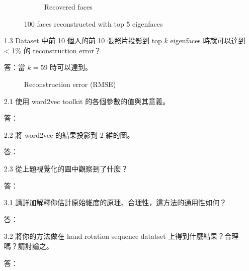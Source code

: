 \documentclass[12pt,a4paper]{extarticle}
\begin{document}
\begin{itemize}
\begin{figure}[H]
\begin{subfigure}[t]{0.5\textwidth}
      \caption{Recovered faces}
      \label{fig:recovered-faces}
    \end{subfigure}
    \caption{100 faces reconstructed with top 5 eigenfaces}
    \label{fig:reconstruct-with-eigenfaces}
  \end{figure}

  \item[1.3] Dataset 中前 10 個人的前 10 張照片投影到 top $k$ eigenfaces 時就可以達到 < 1\% 的 reconstruction error？
  \par 答：當 $k = 59$ 時可以達到。

  \begin{figure}[H]
    \centering
    \caption{Reconstruction error (RMSE)}
    \label{fig:eigenfaces-error-rate}
  \end{figure}

  \item[2.1] 使用 word2vec toolkit 的各個參數的值與其意義。
  \par 答：

  \item[2.2] 將 word2vec 的結果投影到 2 維的圖。
  \par 答：

  \item[2.3] 從上題視覺化的圖中觀察到了什麼？
  \par 答：

  \item[3.1] 請詳加解釋你估計原始維度的原理、合理性，這方法的通用性如何？
  \par 答：

  \item[3.2] 將你的方法做在 hand rotation sequence datatset 上得到什麼結果？合理嗎？請討論之。
  \par 答：

\end{itemize}
\end{document}
